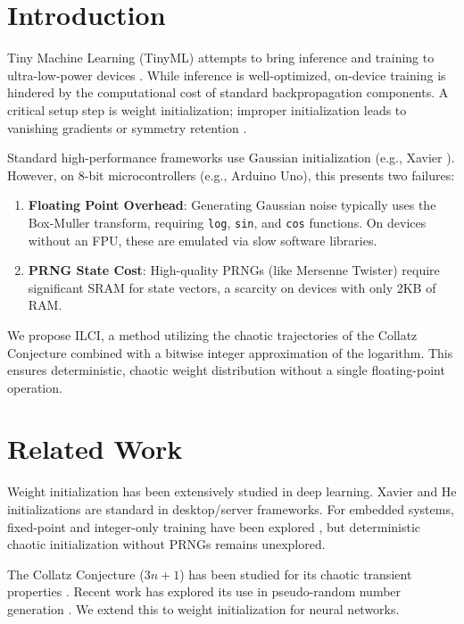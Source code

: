 \documentclass[conference]{IEEEtran}
\begin{document}
\section{Introduction}
Tiny Machine Learning (TinyML) attempts to bring inference and training to ultra-low-power devices \cite{warden2019tinyml}. While inference is well-optimized, on-device training is hindered by the computational cost of standard backpropagation components. A critical setup step is weight initialization; improper initialization leads to vanishing gradients or symmetry retention \cite{goodfellow2016deep}.

Standard high-performance frameworks use Gaussian initialization (e.g., Xavier \cite{glorot2010understanding}). However, on 8-bit microcontrollers (e.g., Arduino Uno), this presents two failures:
\begin{enumerate}
\item \textbf{Floating Point Overhead}: Generating Gaussian noise typically uses the Box-Muller transform, requiring \texttt{log}, \texttt{sin}, and \texttt{cos} functions. On devices without an FPU, these are emulated via slow software libraries.
\item \textbf{PRNG State Cost}: High-quality PRNGs (like Mersenne Twister) require significant SRAM for state vectors, a scarcity on devices with only 2KB of RAM.
\end{enumerate}

We propose ILCI, a method utilizing the chaotic trajectories of the Collatz Conjecture combined with a bitwise integer approximation of the logarithm. This ensures deterministic, chaotic weight distribution without a single floating-point operation.

\section{Related Work}
Weight initialization has been extensively studied in deep learning. Xavier \cite{glorot2010understanding} and He \cite{he2015delving} initializations are standard in desktop/server frameworks. For embedded systems, fixed-point and integer-only training have been explored \cite{han2016deepcompression}, but deterministic chaotic initialization without PRNGs remains unexplored.

The Collatz Conjecture ($3n+1$) has been studied for its chaotic transient properties \cite{lagarias1985collatz}. Recent work has explored its use in pseudo-random number generation \cite{sprott2020collatz}. We extend this to weight initialization for neural networks.
\end{document}
